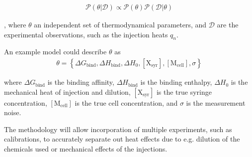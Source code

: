 \documentclass[10pt,final]{article}
\begin{document}
\begin{align}
	\mathcal{P}\left(\theta | \mathcal{D} \right) \propto \mathcal{P}\left(\theta\right) \mathcal{P}(\mathcal{D} | \theta)
\end{align}


, where $\theta$ an independent set of thermodynamical parameters, and $\mathcal{D}$ are the experimental observations, such as the injection heats $q_n$. 

An example model could describe $\theta$ as
\begin{align}
 	\theta   =  \left\{ \Delta G_\mathrm{bind}, \Delta H_\mathrm{bind}, \Delta H_0, [\mathrm{X_{syr}}], [\mathrm{M_{cell}}], \sigma \right\}
\end{align}

where $\Delta G_\mathrm{bind}$ is the binding affinity, $\Delta H_\mathrm{bind}$ is the binding enthalpy, $\Delta H_0$ is the mechanical heat of injection and dilution, $[\mathrm{X_{syr}}]$ is the true syringe concentration, $[\mathrm{M_{cell}}]$ is the true cell concentration, and $\sigma$ is the measurement noise.



The methodology will allow incorporation of multiple experiments, such as calibrations, to accurately separate out heat effects due to e.g. dilution of the chemicals used or mechanical effects of the injections.



\end{document}
